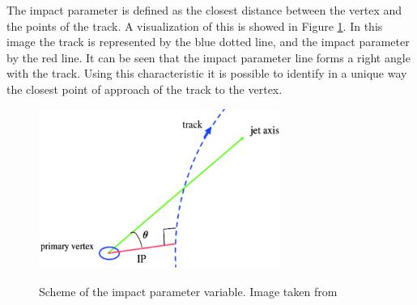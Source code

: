 The impact parameter is defined as the closest distance between the vertex and the points of the track. A visualization of this is showed in Figure \ref{Impact_parameter}. In this image the track is represented by the blue dotted line, and the impact parameter by the red line. It can be seen that the impact parameter line forms a right angle with the track. Using this characteristic it is possible to identify in a unique way the closest point of approach of the track to the vertex.


 \begin{figure}[h] 
 \centering
 \caption{Scheme of the impact parameter variable. Image taken from \cite{Impact_parameter_image}}
 \includegraphics[width=0.7\textwidth]{./Capitulos/VariableDefinitions/impactParameter}  
 \label{Impact_parameter}
 \end{figure} 

 
 
 
 
 
 
 
 
 
 
 
 
 
 
 
 
 
 
 